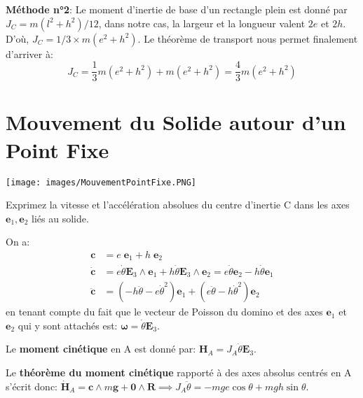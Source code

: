 \documentclass[a4paper]{article}
\begin{document}
\textbf{Méthode n°2}: Le moment d'inertie de base d'un rectangle plein est donné par $ J_C = m (l^2 + h^2) / 12 $, dans notre cas, la largeur et la longueur valent $ 2 e $ et $ 2 h $. D'où, $ J_C = 1/3 \times m (e^2 + h^2) $. Le théorème de transport nous permet finalement d'arriver à: 
\[ J_C = \frac{1}{3} m (e^2 + h^2) + m (e^2 + h^2) = \frac{4}{3} m (e^2 + h^2) \]










\section{Mouvement du Solide autour d'un Point Fixe}





\begin{center} \texttt{[image: images/MouvementPointFixe.PNG]} \end{center}

\begin{siderules}
Exprimez la vitesse et l’accélération absolues du centre d’inertie C dans les axes $ \textbf{e}_1, \textbf{e}_2 $ liés au solide.
\end{siderules}

On a: 
\[ \begin{aligned}
\textbf{c} &= e \; \textbf{e}_1 + h \; \textbf{e}_2 \\
\dot{\textbf{c}} &= e \dot{\theta} \textbf{E}_3 \wedge \textbf{e}_1 + h \dot{\theta} \textbf{E}_3 \wedge \textbf{e}_2 = e \dot{\theta} \textbf{e}_2 - h \dot{\theta} \textbf{e}_1 \\
\ddot{\textbf{c}} &= (- h \ddot{\theta} - e \dot{\theta}^2) \textbf{e}_1 + (e \ddot{\theta} - h \dot{\theta}^2) \textbf{e}_2
\end{aligned} \]
en tenant compte du fait que le vecteur de Poisson du domino et des axes $ \textbf{e}_1 $ et $ \textbf{e}_2 $ qui y sont attachés est: $ \boldsymbol{\omega} = \dot{\theta} \textbf{E}_3 $.




Le \textbf{moment cinétique} en A est donné par: $\displaystyle \textbf{H}_A = J_A \dot{\theta} \textbf{E}_3 $.

Le \textbf{théorème du moment cinétique} rapporté à des axes absolus centrés en A s'écrit donc: $\displaystyle \dot{\textbf{H}}_A = \textbf{c} \wedge m \textbf{g} + \textbf{0} \wedge \textbf{R} \implies J_A \ddot{\theta} = - m g e \cos \theta + m g h \sin \theta $.









\newpage










\tableofcontents
\end{document}
